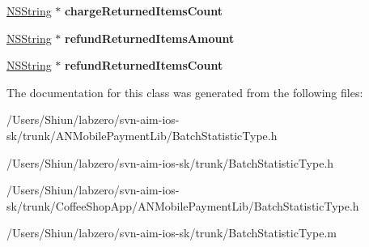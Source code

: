 \begin{DoxyCompactItemize}
\item 
\hypertarget{interface_batch_statistic_type_a0e190410617f1a846f0ea5c050ccb9d1}{
\hyperlink{class_n_s_string}{NSString} $\ast$ {\bfseries chargeReturnedItemsCount}}
\label{interface_batch_statistic_type_a0e190410617f1a846f0ea5c050ccb9d1}

\item 
\hypertarget{interface_batch_statistic_type_a52b6523a5e37e0815edc228e71b82192}{
\hyperlink{class_n_s_string}{NSString} $\ast$ {\bfseries refundReturnedItemsAmount}}
\label{interface_batch_statistic_type_a52b6523a5e37e0815edc228e71b82192}

\item 
\hypertarget{interface_batch_statistic_type_ad9b35a087507417b1d5175f969d0cbab}{
\hyperlink{class_n_s_string}{NSString} $\ast$ {\bfseries refundReturnedItemsCount}}
\label{interface_batch_statistic_type_ad9b35a087507417b1d5175f969d0cbab}

\end{DoxyCompactItemize}


The documentation for this class was generated from the following files:\begin{DoxyCompactItemize}
\item 
/Users/Shiun/labzero/svn-\/aim-\/ios-\/sk/trunk/ANMobilePaymentLib/BatchStatisticType.h\item 
/Users/Shiun/labzero/svn-\/aim-\/ios-\/sk/trunk/BatchStatisticType.h\item 
/Users/Shiun/labzero/svn-\/aim-\/ios-\/sk/trunk/CoffeeShopApp/ANMobilePaymentLib/BatchStatisticType.h\item 
/Users/Shiun/labzero/svn-\/aim-\/ios-\/sk/trunk/BatchStatisticType.m\end{DoxyCompactItemize}
